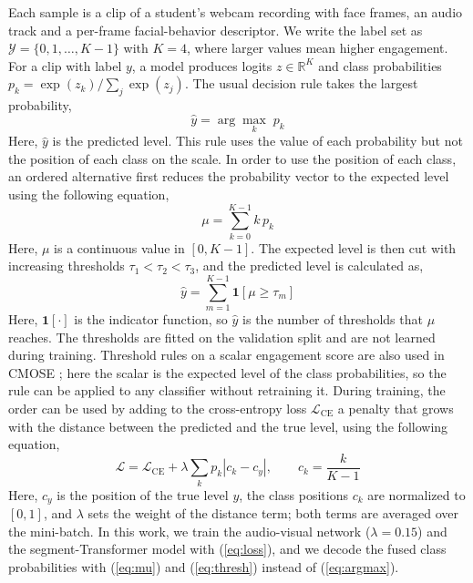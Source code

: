 \documentclass[pdflatex,iicol,sn-basic]{sn-jnl}
\begin{document}
Each sample is a clip of a student's webcam recording with face frames, an audio track and a per-frame facial-behavior descriptor. We write the label set as $\mathcal{Y} = \{0, 1, \ldots, K-1\}$ with $K = 4$, where larger values mean higher engagement. For a clip with label $y$, a model produces logits $z \in \mathbb{R}^{K}$ and class probabilities $p_k = \exp(z_k) / \sum_{j} \exp(z_j)$. The usual decision rule takes the largest probability,
\begin{equation}
\hat{y} = \arg\max_{k} \; p_k \label{eq:argmax}
\end{equation}
Here, $\hat{y}$ is the predicted level. This rule uses the value of each probability but not the position of each class on the scale. In order to use the position of each class, an ordered alternative first reduces the probability vector to the expected level using the following equation,
\begin{equation}
\mu = \sum_{k=0}^{K-1} k \, p_k \label{eq:mu}
\end{equation}
Here, $\mu$ is a continuous value in $[0, K-1]$. The expected level is then cut with increasing thresholds $\tau_1 < \tau_2 < \tau_3$, and the predicted level is calculated as,
\begin{equation}
\hat{y} = \sum_{m=1}^{K-1} \mathbf{1}\!\left[\mu \geq \tau_m\right] \label{eq:thresh}
\end{equation}
Here, $\mathbf{1}[\cdot]$ is the indicator function, so $\hat{y}$ is the number of thresholds that $\mu$ reaches. The thresholds are fitted on the validation split and are not learned during training. Threshold rules on a scalar engagement score are also used in CMOSE \citep{wu2024cmose}; here the scalar is the expected level of the class probabilities, so the rule can be applied to any classifier without retraining it. During training, the order can be used by adding to the cross-entropy loss $\mathcal{L}_{\mathrm{CE}}$ a penalty that grows with the distance between the predicted and the true level, using the following equation,
\begin{equation}
\mathcal{L} = \mathcal{L}_{\mathrm{CE}} + \lambda \sum_{k} p_k \left| c_k - c_y \right|, \qquad c_k = \frac{k}{K-1} \label{eq:loss}
\end{equation}
Here, $c_y$ is the position of the true level $y$, the class positions $c_k$ are normalized to $[0,1]$, and $\lambda$ sets the weight of the distance term; both terms are averaged over the mini-batch. In this work, we train the audio-visual network ($\lambda = 0.15$) and the segment-Transformer model with (\ref{eq:loss}), and we decode the fused class probabilities with (\ref{eq:mu}) and (\ref{eq:thresh}) instead of (\ref{eq:argmax}).
\end{document}
